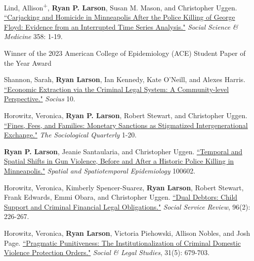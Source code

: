 \documentclass[letterpaper]{article}
\newenvironment{publist}{%
  \begin{list}{}{%
    \setlength{\leftmargin}{0cm}   %
    \setlength{\labelwidth}{2cm}     %
    \setlength{\labelsep}{0.5cm}     %
  }%
}{%
  \end{list}%
}
\renewenvironment{itemize}{
  \begin{list}{}{
    \setlength{\leftmargin}{1.5em}
  }
}{
  \end{list}
}
\begin{document}
\begin{publist}
\item Lind, Allison\textsuperscript{+}, \textbf{Ryan P. Larson}, Susan M. Mason, and Christopher Uggen. \href{https://ryanplarson.github.io/personal_site/pubs/lind_etal_24.pdf}{``Carjacking and Homicide in Minneapolis After the Police Killing of George Floyd:  Evidence from an Interrupted Time Series Analysis."} \textit{Social Science \& Medicine} 358: 1-19.

\begin{itemize}
\item Winner of the 2023 American College of Epidemiology (ACE) Student Paper of the Year Award
\end{itemize}

\item Shannon, Sarah, \textbf{Ryan Larson}, Ian Kennedy,  Kate O'Neill, and Alexes Harris. \href{https://ryanplarson.github.io/personal_site/pubs/shannon_etal_24.pdf}{``Economic Extraction via the Criminal Legal System: A Community-level Perspective."} \textit{Socius} 10. 

\item Horowitz, Veronica, \textbf{Ryan P. Larson}, Robert Stewart, and Christopher Uggen. \href{https://ryanplarson.github.io/personal_site/pubs/horowitz_etal_24.pdf}{``Fines, Fees, and Families: Monetary Sanctions as Stigmatized Intergenerational Exchange."} \textit{The Sociological Quarterly} 1-20.

\item[\textbf{2023}] \textbf{Ryan P. Larson}, Jeanie Santaularia, and Christopher Uggen. \href{https://ryanplarson.github.io/personal_site/pubs/larson_etal_23_online.pdf}{``Temporal and Spatial Shifts in Gun Violence, Before and After a Historic Police Killing in Minneapolis."} \textit{Spatial and Spatiotemporal Epidemiology} 100602.

\item[\textbf{2022}] Horowitz, Veronica, Kimberly Spencer-Suarez, \textbf{Ryan Larson}, Robert Stewart, Frank Edwards, Emmi Obara, and Christopher Uggen. \href{https://ryanplarson.github.io/personal_site/pubs/horowitz_etal_22.pdf}{``Dual Debtors: Child Support and Criminal Financial Legal Obligations."} \textit{Social Service Review}, 96(2): 226-267.

\item Horowitz, Veronica,  \textbf{Ryan Larson}, Victoria Piehowski, Allison Nobles, and Josh Page. \href{https://ryanplarson.github.io/personal_site/pubs/horowitz_etal_21.pdf}{``Pragmatic Punitiveness: The Institutionalization of Criminal Domestic Violence Protection Orders."} \textit{Social \& Legal Studies}, 31(5): 679-703.


\end{publist}
\end{document}
